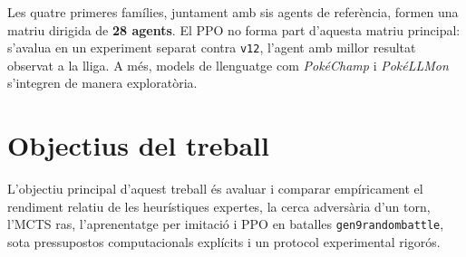 Les quatre primeres famílies, juntament amb sis agents de referència, formen una matriu dirigida de \textbf{28 agents}. El PPO no forma part d'aquesta matriu principal: s'avalua en un experiment separat contra \texttt{v12}, l'agent amb millor resultat observat a la lliga. A més, models de llenguatge com \textit{PokéChamp} i \textit{PokéLLMon} s'integren de manera exploratòria.

\section{Objectius del treball}

L'objectiu principal d'aquest treball és avaluar i comparar empíricament el rendiment relatiu de les heurístiques expertes, la cerca adversària d'un torn, l'MCTS ras, l'aprenentatge per imitació i PPO en batalles \texttt{gen9randombattle}, sota pressupostos computacionals explícits i un protocol experimental rigorós.

